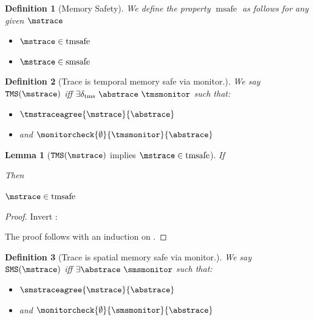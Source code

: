 \documentclass[a4paper,names,dvipsnames]{article}
\newtheorem{definition}{Definition}
\newtheorem{lemma}{Lemma}
\begin{document}
\begin{definition}[Memory Safety]\label{def:memsafe}
  We define the property $\operatorname{msafe}$ as follows for any given $\mstrace$
  \begin{itemize}
    \item $\mstrace\in\operatorname{tmsafe}$
    \item $\mstrace\in\operatorname{smsafe}$
  \end{itemize}
\end{definition}

\begin{definition}[Trace is temporal memory safe via monitor.]\label{def:src:trace:tms}
  We say $\texttt{TMS}(\mstrace)$ iff $\exists \delta_{\text{tms}}\ \abstrace\ \tmsmonitor$ such that:
  \begin{itemize}
    \item $\tmstraceagree{\mstrace}{\abstrace}$
    \item and $\monitorcheck{\emptyset}{\tmsmonitor}{\abstrace}$
  \end{itemize}
\end{definition}

\begin{lemma}[$\texttt{TMS}(\mstrace)$ implies $\mstrace\in\operatorname{tmsafe}$]\label{lem:tmssafe-tracetms}
  If
  Then
  \begin{goals}
    \item $\mstrace\in\operatorname{tmsafe}$
  \end{goals}
\end{lemma}
\begin{proof}
  Invert :
  The proof follows with an induction on .
\end{proof}

\begin{definition}[Trace is spatial memory safe via monitor.]\label{def:src:trace:sms}
  We say $\texttt{SMS}(\mstrace)$ iff $\exists \abstrace\ \smsmonitor$ such that:
  \begin{itemize}
    \item $\smstraceagree{\mstrace}{\abstrace}$
    \item and $\monitorcheck{\emptyset}{\smsmonitor}{\abstrace}$
  \end{itemize}
\end{definition}
\end{document}
